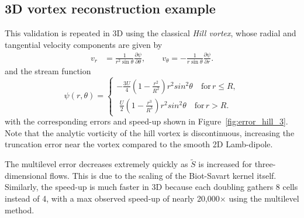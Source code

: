 \documentclass[final,1p,times]{elsarticle}
\begin{document}

\subsection{3D vortex reconstruction example}

This validation is repeated in 3D using the classical \emph{Hill vortex}, whose radial and tangential velocity components are given by
\begin{align}
    v_r &= \frac{1}{r^2\sin\theta}\frac{\partial\psi}{\partial\theta}, \qquad v_\theta = -\frac{1}{r\sin\theta}\frac{\partial\psi}{\partial r}.
\end{align}
and the stream function 
\begin{equation}
    \psi(r,\theta) = \begin{cases}
    -\frac{3U}{4}\left(1-\frac{r^2}{R^2}\right)r^2sin^2\theta \quad \text{for} \, r \le R,\\
     \,\,\frac{U}{2}\left(1-\frac{r^3}{R^3}\right)r^2sin^2\theta \quad \text{for} \, r > R.
    \end{cases}
\end{equation}
with the corresponding errors and speed-up shown in Figure~\ref{fig:error_hill_3}. Note that the analytic vorticity of the hill vortex is discontinuous, increasing the truncation error near the vortex compared to the smooth 2D Lamb-dipole.

The multilevel error decreases extremely quickly as $\tilde S$ is increased for three-dimensional flows. This is due to the scaling of the Biot-Savart kernel itself. Similarly, the speed-up is much faster in 3D because each doubling gathers 8 cells instead of 4, with a max observed speed-up of nearly 20,000$\times$ using the multilevel method.
\end{document}

